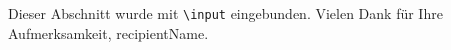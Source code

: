 Dieser Abschnitt wurde mit \texttt{\textbackslash input} eingebunden. Vielen Dank für Ihre Aufmerksamkeit, {{recipientName}}.
